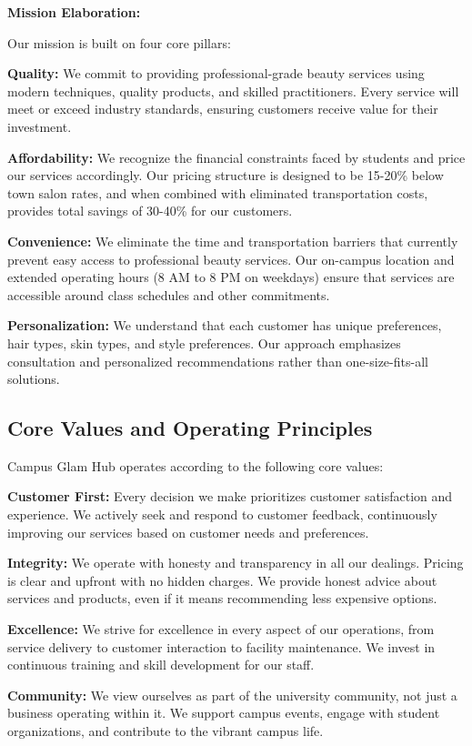 \documentclass[a4paper,12pt]{article}
\begin{document}
\textbf{Mission Elaboration:}

Our mission is built on four core pillars:

\textbf{Quality:} We commit to providing professional-grade beauty services using modern techniques, quality products, and skilled practitioners. Every service will meet or exceed industry standards, ensuring customers receive value for their investment.

\textbf{Affordability:} We recognize the financial constraints faced by students and price our services accordingly. Our pricing structure is designed to be 15-20\% below town salon rates, and when combined with eliminated transportation costs, provides total savings of 30-40\% for our customers.

\textbf{Convenience:} We eliminate the time and transportation barriers that currently prevent easy access to professional beauty services. Our on-campus location and extended operating hours (8 AM to 8 PM on weekdays) ensure that services are accessible around class schedules and other commitments.

\textbf{Personalization:} We understand that each customer has unique preferences, hair types, skin types, and style preferences. Our approach emphasizes consultation and personalized recommendations rather than one-size-fits-all solutions.

\subsection{Core Values and Operating Principles}

Campus Glam Hub operates according to the following core values:

\textbf{Customer First:} Every decision we make prioritizes customer satisfaction and experience. We actively seek and respond to customer feedback, continuously improving our services based on customer needs and preferences.

\textbf{Integrity:} We operate with honesty and transparency in all our dealings. Pricing is clear and upfront with no hidden charges. We provide honest advice about services and products, even if it means recommending less expensive options.

\textbf{Excellence:} We strive for excellence in every aspect of our operations, from service delivery to customer interaction to facility maintenance. We invest in continuous training and skill development for our staff.

\textbf{Community:} We view ourselves as part of the university community, not just a business operating within it. We support campus events, engage with student organizations, and contribute to the vibrant campus life.
\end{document}
